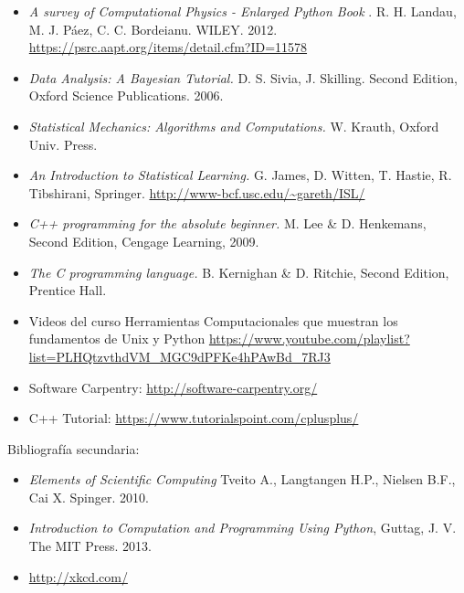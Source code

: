 \documentclass[letterpaper,10pt,onecolumn]{article}
\begin{document}
\begin{itemize}
\item
\textit{A survey of Computational Physics - Enlarged Python Book}
. R. H. Landau, M. J. P\'aez, C. C. Bordeianu. WILEY. 2012.
\url{https://psrc.aapt.org/items/detail.cfm?ID=11578}

\item
\textit{Data Analysis: A Bayesian Tutorial.} D. S. Sivia,
J. Skilling. Second Edition, Oxford Science Publications. 2006.

\item 
\textit{Statistical Mechanics: Algorithms and Computations.}
W. Krauth, Oxford Univ. Press. 

\item
\textit{An Introduction to Statistical Learning.} G. James, D. Witten,
T. Hastie, R. Tibshirani,
Springer. \url{http://www-bcf.usc.edu/~gareth/ISL/} 

\item
\textit{C++ programming for the absolute beginner.}
 M. Lee \& D. Henkemans, Second Edition, Cengage Learning, 2009.

\item
\textit{The C programming language.}
 B. Kernighan \& D. Ritchie, Second Edition, Prentice Hall.

\item Videos del curso Herramientas Computacionales que muestran los
  fundamentos de Unix y Python \url{https://www.youtube.com/playlist?list=PLHQtzvthdVM_MGC9dPFKe4hPAwBd_7RJ3}

\item Software Carpentry: \url{http://software-carpentry.org/}
\item C++ Tutorial: \url{https://www.tutorialspoint.com/cplusplus/}
\end{itemize}

\noindent\normalsize Bibliograf\'ia secundaria:
\begin{itemize}
\item
\textit{Elements of Scientific Computing}
Tveito A., Langtangen H.P., Nielsen B.F., Cai X. Spinger. 2010.


\item 
\textit{Introduction to Computation and Programming Using Python},
Guttag, J. V. The MIT Press. 2013.

\item\url{http://xkcd.com/}
\end{itemize}
\end{document}
